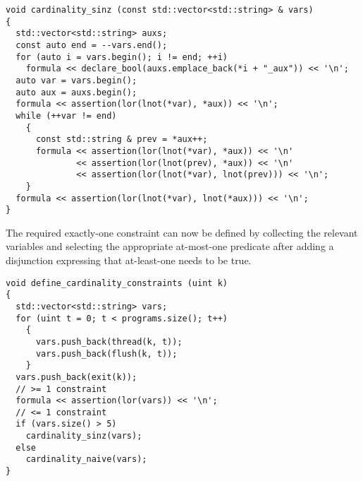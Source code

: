 \begin{lstlisting}[style=c++]
void cardinality_sinz (const std::vector<std::string> & vars)
{
  std::vector<std::string> auxs;
  const auto end = --vars.end();
  for (auto i = vars.begin(); i != end; ++i)
    formula << declare_bool(auxs.emplace_back(*i + "_aux")) << '\n';
  auto var = vars.begin();
  auto aux = auxs.begin();
  formula << assertion(lor(lnot(*var), *aux)) << '\n';
  while (++var != end)
    {
      const std::string & prev = *aux++;
      formula << assertion(lor(lnot(*var), *aux)) << '\n'
              << assertion(lor(lnot(prev), *aux)) << '\n'
              << assertion(lor(lnot(*var), lnot(prev))) << '\n';
    }
  formula << assertion(lor(lnot(*var), lnot(*aux))) << '\n';
}
\end{lstlisting}

%
%
%


\noindent
The required exactly-one constraint can now be defined by collecting the relevant variables and selecting the appropriate at-most-one predicate after adding a disjunction expressing that at-least-one needs to be true.

\begin{lstlisting}[style=c++]
void define_cardinality_constraints (uint k)
{
  std::vector<std::string> vars;
  for (uint t = 0; t < programs.size(); t++)
    {
      vars.push_back(thread(k, t));
      vars.push_back(flush(k, t));
    }
  vars.push_back(exit(k));
  // >= 1 constraint
  formula << assertion(lor(vars)) << '\n';
  // <= 1 constraint
  if (vars.size() > 5)
    cardinality_sinz(vars);
  else
    cardinality_naive(vars);
}
\end{lstlisting}

